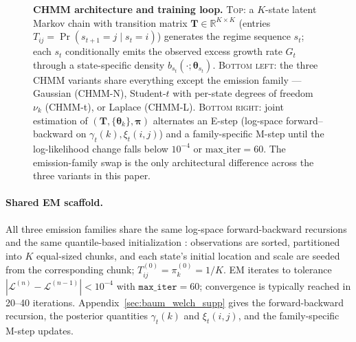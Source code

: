 \begin{figure}[t]
\caption{\textbf{CHMM architecture and training loop.} \textsc{Top}: a $K$-state latent Markov chain with transition matrix $\mathbf{T} \in \mathbb{R}^{K \times K}$ (entries $T_{ij} = \Pr(s_{t+1} = j \mid s_t = i)$) generates the regime sequence $s_t$; each $s_t$ conditionally emits the observed excess growth rate $G_t$ through a state-specific density $b_{s_t}(\cdot; \boldsymbol\theta_{s_t})$. \textsc{Bottom left}: the three CHMM variants share everything except the emission family --- Gaussian (CHMM-N), Student-$t$ with per-state degrees of freedom $\nu_k$ (CHMM-t), or Laplace (CHMM-L). \textsc{Bottom right}: joint estimation of $(\mathbf{T}, \{\boldsymbol\theta_k\}, \boldsymbol\pi)$ alternates an E-step (log-space forward--backward on $\gamma_t(k), \xi_t(i,j)$) and a family-specific M-step until the log-likelihood change falls below $10^{-4}$ or $\mathrm{max\_iter} = 60$. The emission-family swap is the only architectural difference across the three variants in this paper.}
\label{fig:chmm_architecture}
\end{figure}

\paragraph{Shared EM scaffold.}
All three emission families share the same log-space forward-backward
recursions and the same quantile-based initialization \cite{bilmes1998gentle}:
observations are sorted, partitioned into $K$ equal-sized chunks, and each
state's initial location and scale are seeded from the corresponding chunk;
$T_{ij}^{(0)} = \pi_k^{(0)} = 1/K$.
EM iterates to tolerance $|\mathcal{L}^{(n)} - \mathcal{L}^{(n-1)}| < 10^{-4}$
with $\texttt{max\_iter} = 60$; convergence is typically reached in
20--40 iterations.
Appendix~\ref{sec:baum_welch_supp} gives the forward-backward recursion,
the posterior quantities $\gamma_t(k)$ and $\xi_t(i, j)$, and the
family-specific M-step updates.

